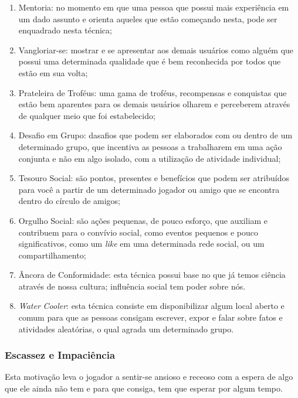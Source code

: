 \begin{enumerate}
    \item Mentoria: no momento em que uma pessoa que possui mais experiência
        em um dado assunto e orienta aqueles que estão começando nesta, pode
        ser enquadrado nesta técnica;
    \item Vangloriar-se: mostrar e se apresentar aos demais usuários como
        alguém que possui uma determinada qualidade que é bem reconhecida
        por todos que estão em sua volta;
    \item Prateleira de Troféus: uma gama de troféus, recompensas e conquistas
        que estão bem aparentes para os demais usuários olharem e perceberem
        através de qualquer meio que foi estabelecido;
    \item Desafio em Grupo: dasafios que podem ser elaborados com ou dentro
        de um determinado grupo, que incentiva as pessoas a trabalharem
        em uma ação conjunta e não em algo isolado, com a utilização de atividade
        individual;
    \item Tesouro Social: são pontos, presentes e benefícios que podem ser atribuídos
        para você a partir de um determinado jogador ou amigo que se encontra dentro
        do círculo de amigos;
    \item Orgulho Social:  são ações pequenas, de pouco esforço, que auxiliam e contribuem
        para o convívio social, como eventos pequenos e pouco significativos,
        como um \textit{like} em uma determinada rede social, ou um compartilhamento;
    \item Âncora de Conformidade: esta técnica possui base no que já temos ciência
        através de nossa cultura;
        influência social tem poder sobre nós.
    \item \textit{Water} \textit{Cooler}: esta técnica consiste em disponibilizar algum local
        aberto e comum para que as pessoas consigam escrever, expor e falar
        sobre fatos e atividades aleatórias, o qual agrada um determinado grupo.

\end{enumerate}

\subsubsection{Escassez e Impaciência}
\label{sub:escassexeimpaciencia}
Esta motivação leva o jogador a sentir-se ansioso e receoso com a espera de algo
que ele ainda não tem e para que consiga, tem que esperar por algum tempo.


